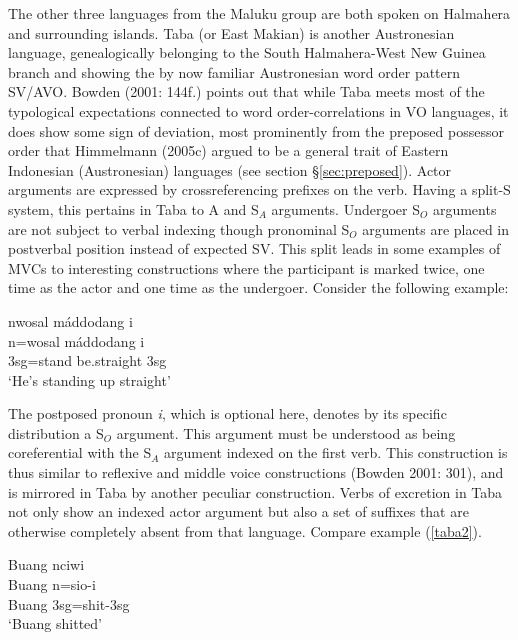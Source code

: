 The other three languages from the Maluku group are both spoken on Halmahera and surrounding islands. Taba (or East Makian) is another Austronesian language, genealogically belonging to the South Halmahera-West New Guinea branch and showing the by now familiar Austronesian word order pattern SV/AVO. Bowden (2001: 144f.) points out that while Taba meets most of the typological expectations connected to word order-correlations in VO languages, it does show some sign of deviation, most prominently from the preposed possessor order that Himmelmann (2005c) argued to be a general trait of Eastern Indonesian (Austronesian) languages (see section §\ref{sec:preposed}). Actor arguments are expressed by crossreferencing prefixes on the verb. Having a split-S system, this pertains in Taba to A and S$_A$ arguments. Undergoer S$_O$ arguments are not subject to verbal indexing though pronominal S$_O$ arguments are placed in postverbal position instead of expected SV. This split leads in some examples of MVCs to interesting constructions where the participant is marked twice, one time as the actor and one time as the undergoer. Consider the following example:

\ea \label{taba1}
\gll nwosal máddodang i \\
n=wosal máddodang i \\
\glc \acs{3}\acs{sg}=stand be.straight \acs{3}\acs{sg} \\
\glft `He's standing up straight' \\ 
\z
\xe

The postposed pronoun \textit{i}, which is optional here, denotes by its specific distribution a S$_O$ argument. This argument must be understood as being coreferential with the S$_A$ argument indexed on the first verb. This construction is thus similar to reflexive and middle voice constructions (Bowden 2001: 301), and is mirrored in Taba by another peculiar construction. Verbs of excretion in Taba not only show an indexed actor argument but also a set of suffixes that are otherwise completely absent from that language. Compare example (\ref{taba2}).

\ea \label{taba2}
\gll Buang nciwi \\
Buang n=sio-i \\
\glc Buang \acs{3}\acs{sg}=shit-\acs{3}\acs{sg} \\
\glft `Buang shitted' \\ 
\z
\xe

